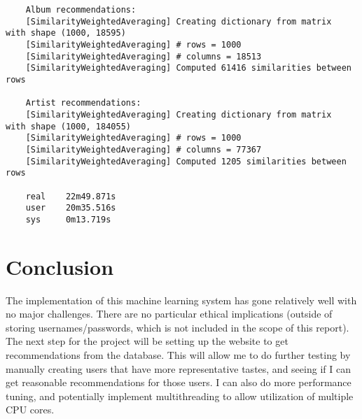 \documentclass[12pt]{article}
\begin{document}
	\newpage

	\begin{verbatim}
	Album recommendations:
	[SimilarityWeightedAveraging] Creating dictionary from matrix  with shape (1000, 18595)
	[SimilarityWeightedAveraging] # rows = 1000
	[SimilarityWeightedAveraging] # columns = 18513
	[SimilarityWeightedAveraging] Computed 61416 similarities between rows

	Artist recommendations:
	[SimilarityWeightedAveraging] Creating dictionary from matrix  with shape (1000, 184055)
	[SimilarityWeightedAveraging] # rows = 1000
	[SimilarityWeightedAveraging] # columns = 77367
	[SimilarityWeightedAveraging] Computed 1205 similarities between rows

	real    22m49.871s
	user    20m35.516s
	sys     0m13.719s
	\end{verbatim}

	\section*{Conclusion}
	The implementation of this machine learning system has gone relatively well with no major challenges. There are no particular ethical implications (outside of storing usernames/passwords, which is not included in the scope of this report). The next step for the project will be setting up the website to get recommendations from the database. This will allow me to do further testing by manually creating users that have more representative tastes, and seeing if I can get reasonable recommendations for those users. I can also do more performance tuning, and potentially implement multithreading to allow utilization of multiple CPU cores.
\end{document}
